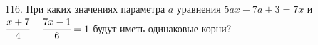 116. При каких значениях параметра $a$ уравнения $5ax - 7a + 3 = 7x$ и $\cfrac{x+7}{4}-\cfrac{7x-1}{6}=1$ будут иметь одинаковые корни?\\
